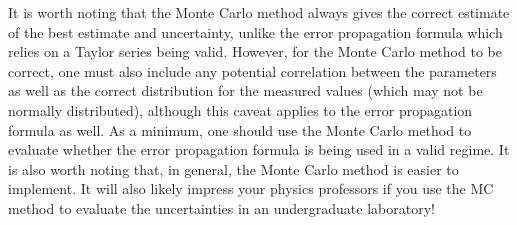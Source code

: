 It is worth noting that the Monte Carlo method always gives the correct estimate of the best estimate and uncertainty, unlike the error propagation formula which relies on a Taylor series being valid. However, for the Monte Carlo method to be correct, one must also include any potential correlation between the parameters as well as the correct distribution for the measured values (which may not be normally distributed), although this caveat applies to the error propagation formula as well. As a minimum, one should use the Monte Carlo method to evaluate whether the error propagation formula is being used in a valid regime. It is also worth noting that, in general, the Monte Carlo method is easier to implement. It will also likely impress your physics professors if you use the MC method to evaluate the uncertainties in an undergraduate laboratory!

